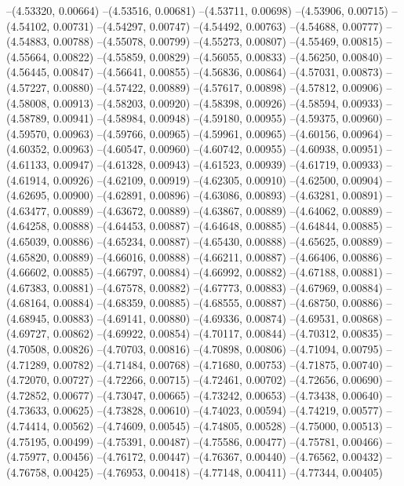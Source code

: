 --(4.53320, 0.00664)
--(4.53516, 0.00681)
--(4.53711, 0.00698)
--(4.53906, 0.00715)
--(4.54102, 0.00731)
--(4.54297, 0.00747)
--(4.54492, 0.00763)
--(4.54688, 0.00777)
--(4.54883, 0.00788)
--(4.55078, 0.00799)
--(4.55273, 0.00807)
--(4.55469, 0.00815)
--(4.55664, 0.00822)
--(4.55859, 0.00829)
--(4.56055, 0.00833)
--(4.56250, 0.00840)
--(4.56445, 0.00847)
--(4.56641, 0.00855)
--(4.56836, 0.00864)
--(4.57031, 0.00873)
--(4.57227, 0.00880)
--(4.57422, 0.00889)
--(4.57617, 0.00898)
--(4.57812, 0.00906)
--(4.58008, 0.00913)
--(4.58203, 0.00920)
--(4.58398, 0.00926)
--(4.58594, 0.00933)
--(4.58789, 0.00941)
--(4.58984, 0.00948)
--(4.59180, 0.00955)
--(4.59375, 0.00960)
--(4.59570, 0.00963)
--(4.59766, 0.00965)
--(4.59961, 0.00965)
--(4.60156, 0.00964)
--(4.60352, 0.00963)
--(4.60547, 0.00960)
--(4.60742, 0.00955)
--(4.60938, 0.00951)
--(4.61133, 0.00947)
--(4.61328, 0.00943)
--(4.61523, 0.00939)
--(4.61719, 0.00933)
--(4.61914, 0.00926)
--(4.62109, 0.00919)
--(4.62305, 0.00910)
--(4.62500, 0.00904)
--(4.62695, 0.00900)
--(4.62891, 0.00896)
--(4.63086, 0.00893)
--(4.63281, 0.00891)
--(4.63477, 0.00889)
--(4.63672, 0.00889)
--(4.63867, 0.00889)
--(4.64062, 0.00889)
--(4.64258, 0.00888)
--(4.64453, 0.00887)
--(4.64648, 0.00885)
--(4.64844, 0.00885)
--(4.65039, 0.00886)
--(4.65234, 0.00887)
--(4.65430, 0.00888)
--(4.65625, 0.00889)
--(4.65820, 0.00889)
--(4.66016, 0.00888)
--(4.66211, 0.00887)
--(4.66406, 0.00886)
--(4.66602, 0.00885)
--(4.66797, 0.00884)
--(4.66992, 0.00882)
--(4.67188, 0.00881)
--(4.67383, 0.00881)
--(4.67578, 0.00882)
--(4.67773, 0.00883)
--(4.67969, 0.00884)
--(4.68164, 0.00884)
--(4.68359, 0.00885)
--(4.68555, 0.00887)
--(4.68750, 0.00886)
--(4.68945, 0.00883)
--(4.69141, 0.00880)
--(4.69336, 0.00874)
--(4.69531, 0.00868)
--(4.69727, 0.00862)
--(4.69922, 0.00854)
--(4.70117, 0.00844)
--(4.70312, 0.00835)
--(4.70508, 0.00826)
--(4.70703, 0.00816)
--(4.70898, 0.00806)
--(4.71094, 0.00795)
--(4.71289, 0.00782)
--(4.71484, 0.00768)
--(4.71680, 0.00753)
--(4.71875, 0.00740)
--(4.72070, 0.00727)
--(4.72266, 0.00715)
--(4.72461, 0.00702)
--(4.72656, 0.00690)
--(4.72852, 0.00677)
--(4.73047, 0.00665)
--(4.73242, 0.00653)
--(4.73438, 0.00640)
--(4.73633, 0.00625)
--(4.73828, 0.00610)
--(4.74023, 0.00594)
--(4.74219, 0.00577)
--(4.74414, 0.00562)
--(4.74609, 0.00545)
--(4.74805, 0.00528)
--(4.75000, 0.00513)
--(4.75195, 0.00499)
--(4.75391, 0.00487)
--(4.75586, 0.00477)
--(4.75781, 0.00466)
--(4.75977, 0.00456)
--(4.76172, 0.00447)
--(4.76367, 0.00440)
--(4.76562, 0.00432)
--(4.76758, 0.00425)
--(4.76953, 0.00418)
--(4.77148, 0.00411)
--(4.77344, 0.00405)
